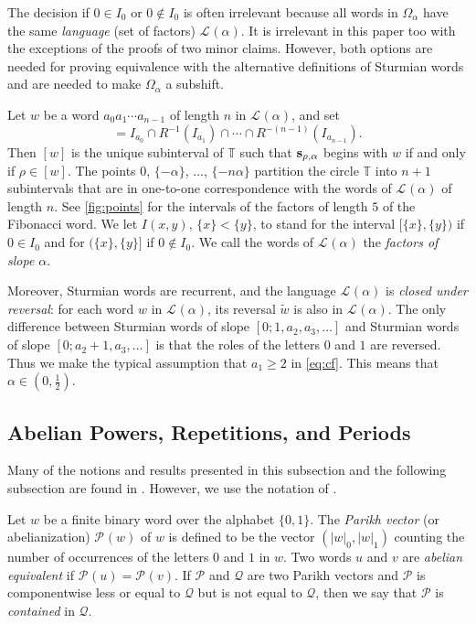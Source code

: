 \documentclass[a4paper,fleqn]{article}
\providecommand{\abs}[1]{\lvert#1\rvert}
\newcommand{\Lang}[2][]{\mathcal{L}_{#1}(#2)}
\newcommand{\infw}[1]{%
  \ifcat\noexpand#1\relax\bm{#1}%
  \else\mathbf{#1}\fi}          %
\newcommand{\mirror}[1]{\widetilde{#1}}
\newcommand{\Parikh}[2][]{\mathcal{P}_{#1}(#2)}
\newcommand{\T}{\mathbb{T}}
\begin{document}
  The decision if $0 \in I_0$ or $0 \notin I_0$ is often irrelevant because all words in $\Omega_\alpha$ have the same
  \emph{language} (set of factors) $\Lang{\alpha}$. It is irrelevant in this paper too with the exceptions of the
  proofs of two minor claims. However, both options are needed for proving equivalence with the alternative definitions
  of Sturmian words and are needed to make $\Omega_\alpha$ a subshift.

  Let $w$ be a word $a_0 a_1 \dotsm a_{n-1}$ of length $n$ in $\Lang{\alpha}$, and set
  \begin{equation*}
    [w] = I_{a_0} \cap R^{-1}(I_{a_1}) \cap \dotsm \cap R^{-(n-1)}(I_{a_{n-1}}).
  \end{equation*}
  Then $[w]$ is the unique subinterval of $\T$ such that $\infw{s}_{\rho,\alpha}$ begins with $w$ if and only if
  $\rho \in [w]$. The points $0$, $\{-\alpha\}$, $\ldots$, $\{-n\alpha\}$ partition the circle $\T$ into $n + 1$
  subintervals that are in one-to-one correspondence with the words of $\Lang{\alpha}$ of length $n$. See
  \autoref{fig:points} for the intervals of the factors of length $5$ of the Fibonacci word. We let $I(x, y)$,
  $\{x\} < \{y\}$, to stand for the interval $[\{x\}, \{y\})$ if $0 \in I_0$ and for $(\{x\}, \{y\}]$ if
  $0 \notin I_0$. We call the words of $\Lang{\alpha}$ the \emph{factors of slope $\alpha$}.

  Moreover, Sturmian words are recurrent, and the language $\Lang{\alpha}$ is \emph{closed under reversal}: for each
  word $w$ in $\Lang{\alpha}$, its reversal $\mirror{w}$ is also in $\Lang{\alpha}$. The only difference between
  Sturmian words of slope $[0; 1, a_2, a_3, \ldots]$ and Sturmian words of slope $[0; a_2 + 1, a_3, \ldots]$ is that
  the roles of the letters $0$ and $1$ are reversed. Thus we make the typical assumption that $a_1 \geq 2$ in
  \eqref{eq:cf}. This means that $\alpha \in (0, \tfrac12)$.

  \subsection{Abelian Powers, Repetitions, and Periods}
  Many of the notions and results presented in this subsection and the following subsection are found in
  \cite{2016:abelian_powers_and_repetitions_in_sturmian_words}. However, we use the notation of
  \cite[Ch.~4.7]{diss:jarkko_peltomaki}.

  Let $w$ be a finite binary word over the alphabet $\{0, 1\}$. The \emph{Parikh vector} (or abelianization)
  $\Parikh{w}$ of $w$ is defined to be the vector $(\abs{w}_0, \abs{w}_1)$ counting the number of occurrences of the
  letters $0$ and $1$ in $w$. Two words $u$ and $v$ are \emph{abelian equivalent} if $\Parikh{u} = \Parikh{v}$. If
  $\mathcal{P}$ and $\mathcal{Q}$ are two Parikh vectors and $\mathcal{P}$ is componentwise less or equal to
  $\mathcal{Q}$ but is not equal to $\mathcal{Q}$, then we say that $\mathcal{P}$ is \emph{contained} in $\mathcal{Q}$.
\end{document}

